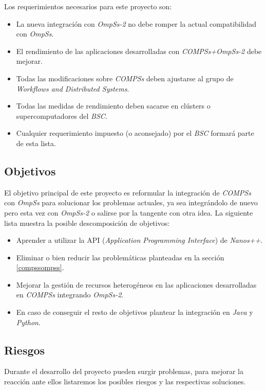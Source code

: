 \documentclass[a4paper]{article}
\begin{document}
 Los requerimientos necesarios para este proyecto son:

\begin{itemize}
 \item La nueva integración con \textit{OmpSs-2} no debe romper la actual compatibilidad con \textit{OmpSs}.
 \item El rendimiento de las aplicaciones desarrolladas con \textit{COMPSs+OmpSs-2} debe mejorar.
 \item Todas las modificaciones sobre \textit{COMPSs} deben ajustarse al grupo de \textit{Workflows and Distributed Systems}.
 \item Todas las medidas de rendimiento deben sacarse en clústers o supercomputadores del \textit{BSC}.
 \item Cualquier requerimiento impuesto (o aconsejado) por el \textit{BSC} formará parte de esta lista.
  
\end{itemize}

\subsection{Objetivos}

El objetivo principal de este proyecto es reformular la integración de \textit{COMPSs} con \textit{OmpSs} para solucionar los problemas actuales, ya sea integrándolo de nuevo pero esta vez con \textit{OmpSs-2} o salirse por la tangente con otra idea. La siguiente lista muestra la posible descomposición de objetivos:

\begin{itemize}
 \item Aprender a utilizar la API (\textit{Application Programming Interface}) de \textit{Nanos++}.
 \item Eliminar o bien reducir las problemáticas planteadas en la sección   \ref{compssompss}.
  \item Mejorar la gestión de recursos heterogéneos en las aplicaciones desarrolladas en \textit{COMPSs} integrando \textit{OmpSs-2}.
 \item En caso de conseguir el resto de objetivos plantear la integración en \textit{Java} y \textit{Python}.
\end{itemize}

\subsection{Riesgos}

Durante el desarrollo del proyecto pueden surgir problemas, para mejorar la reacción ante ellos listaremos los posibles riesgos y las respectivas soluciones.
\end{document}
